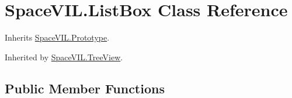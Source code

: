 \hypertarget{class_space_v_i_l_1_1_list_box}{}\section{Space\+V\+I\+L.\+List\+Box Class Reference}
\label{class_space_v_i_l_1_1_list_box}


Inherits \mbox{\hyperlink{class_space_v_i_l_1_1_prototype}{Space\+V\+I\+L.\+Prototype}}.



Inherited by \mbox{\hyperlink{class_space_v_i_l_1_1_tree_view}{Space\+V\+I\+L.\+Tree\+View}}.

\subsection*{Public Member Functions}
